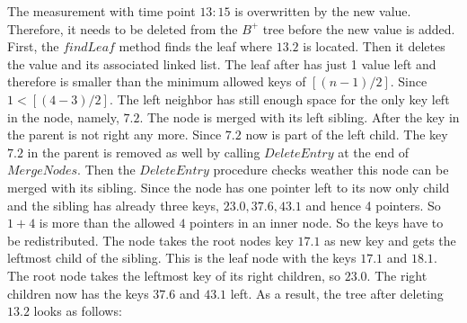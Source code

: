 \documentclass[abstracton,12pt]{scrreprt}
\begin{document}
\begin{exmp}
	The measurement with time point $13:15$ is overwritten by the new value. Therefore, it needs to be deleted from the $B^+$ tree before the new value is added. First, the $findLeaf$ method finds the leaf where $13.2$ is located. Then it deletes the value and its associated linked list. The leaf after has just 1 value left and therefore is smaller than the minimum allowed keys of $[(n-1)/2]$. Since $1<[(4-3)/2]$. The left neighbor has still enough space for the only key left in the node, namely, $7.2$. The node is merged with its left sibling. After the key in the parent is not right any more. Since $7.2$ now is part of the left child. The key $7.2$ in the parent is removed as well by calling $DeleteEntry$ at the end of $MergeNodes$. Then the $DeleteEntry$ procedure checks weather this node can be merged with its sibling. Since the node has one pointer left to its now only child and the sibling has already three keys, $23.0,37.6, 43.1$ and hence 4 pointers. So $1+4$ is more than the allowed $4$ pointers in an inner node. So the keys have to be redistributed. The node takes the root nodes key $17.1$ as new key and gets the leftmost child of the sibling. This is the leaf node with the keys $17.1$ and $18.1$. The root node takes the leftmost key of its right children, so $23.0$. The right children now has the keys $37.6$ and $43.1$ left. 
	As a result, the tree after deleting $13.2$ looks as follows: 
\end{exmp}
\end{document}
